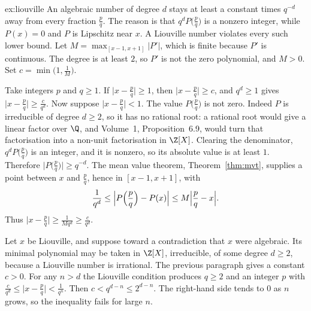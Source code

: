 \begin{solution}{ex:liouville}
\idea An algebraic number of degree $d$ stays at least a constant times $q^{-d}$ away from every fraction $\frac pq$. The reason is that $q^d P\bigl(\frac pq\bigr)$ is a nonzero integer, while $P(x)=0$ and $P$ is Lipschitz near $x$. A Liouville number violates every such lower bound.
\writeup Let $M=\max_{[x-1,x+1]}|P'|$, which is finite because $P'$ is continuous. The degree is at least $2$, so $P'$ is not the zero polynomial, and $M>0$. Set $c=\min\bigl(1,\frac1M\bigr)$.

Take integers $p$ and $q\ge1$. If $\bigl|x-\frac pq\bigr|\ge1$, then $\bigl|x-\frac pq\bigr|\ge c$, and $q^d\ge1$ gives $\bigl|x-\frac pq\bigr|\ge\frac c{q^d}$. Now suppose $\bigl|x-\frac pq\bigr|<1$. The value $P\bigl(\frac pq\bigr)$ is not zero. Indeed $P$ is irreducible of degree $d\ge2$, so it has no rational root: a rational root would give a linear factor over $\Q$, and Volume~1, Proposition~6.9, would turn that factorisation into a non-unit factorisation in $\Z[X]$. Clearing the denominator, $q^d P\bigl(\frac pq\bigr)$ is an integer, and it is nonzero, so its absolute value is at least $1$. Therefore $\bigl|P\bigl(\frac pq\bigr)\bigr|\ge q^{-d}$. The mean value theorem, Theorem~\ref{thm:mvt}, supplies a point between $x$ and $\frac pq$, hence in $[x-1,x+1]$, with
\[\frac1{q^d}\le\Bigl|P\Bigl(\frac pq\Bigr)-P(x)\Bigr|\le M\Bigl|\frac pq-x\Bigr|.\]
Thus $\bigl|x-\frac pq\bigr|\ge\frac1{Mq^d}\ge\frac c{q^d}$.

Let $x$ be Liouville, and suppose toward a contradiction that $x$ were algebraic. Its minimal polynomial may be taken in $\Z[X]$, irreducible, of some degree $d\ge2$, because a Liouville number is irrational. The previous paragraph gives a constant $c>0$. For any $n>d$ the Liouville condition produces $q\ge2$ and an integer $p$ with $\frac c{q^d}\le\bigl|x-\frac pq\bigr|<\frac1{q^n}$. Then $c<q^{d-n}\le2^{d-n}$. The right-hand side tends to $0$ as $n$ grows, so the inequality fails for large $n$.
\end{solution}

